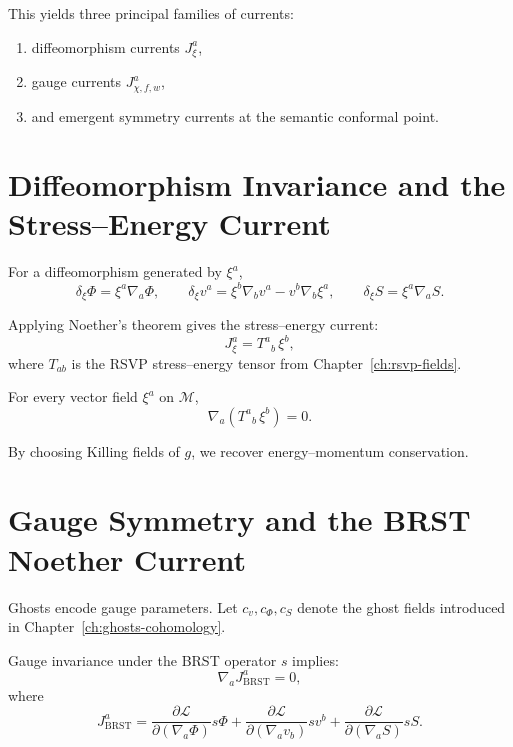 This yields three principal families of currents:

\begin{enumerate}
\item diffeomorphism currents $J^a_{\xi}$,
\item gauge currents $J^a_{\chi,f,w}$,
\item and emergent symmetry currents at the semantic conformal point.
\end{enumerate}

\section{Diffeomorphism Invariance and the Stress–Energy Current}

For a diffeomorphism generated by $\xi^a$,
\[
\delta_\xi \Phi = \xi^a \nabla_a \Phi, \qquad
\delta_\xi v^a = \xi^b \nabla_b v^a - v^b \nabla_b \xi^a, \qquad
\delta_\xi S = \xi^a \nabla_a S.
\]

Applying Noether’s theorem gives the stress–energy current:
\[
J^a_\xi = T^a{}_b \, \xi^b,
\]
where $T_{ab}$ is the RSVP stress–energy tensor from
Chapter~\ref{ch:rsvp-fields}.

\begin{corollary}
For every vector field $\xi^a$ on $\mathcal{M}$,
\[
\nabla_a (T^a{}_b\, \xi^b) = 0.
\]
\end{corollary}

By choosing Killing fields of $g$, we recover energy–momentum conservation.

\section{Gauge Symmetry and the BRST Noether Current}

Ghosts encode gauge parameters.  
Let $c_v, c_\Phi, c_S$ denote the ghost fields introduced in
Chapter~\ref{ch:ghosts-cohomology}.

\begin{theorem}
Gauge invariance under the BRST operator $s$ implies:
\[
\nabla_a J^a_{\mathrm{BRST}} = 0,
\]
where
\[
J^a_{\mathrm{BRST}}
  = \frac{\partial \mathcal{L}}{\partial (\nabla_a \Phi)} s\Phi
   + \frac{\partial \mathcal{L}}{\partial (\nabla_a v_b)} s v^b
   + \frac{\partial \mathcal{L}}{\partial (\nabla_a S)} sS.
\]
\end{theorem}

